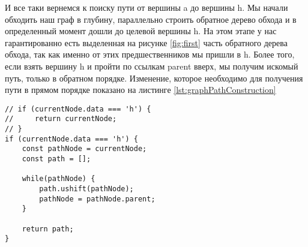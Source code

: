 \documentclass[../article.tex]{subfiles}
\begin{document}
И все таки вернемся к поиску пути от вершины {\firacodebold a} до вершины {\firacodebold h}. Мы начали обходить наш граф в глубину, параллельно строить обратное дерево обхода и в определенный момент дошли до целевой вершины {\firacodebold h}. На этом этапе у нас гарантированно есть выделенная на рисунке \ref{fig:first} часть обратного дерева обхода, так как именно от этих предшественников мы пришли в {\firacodebold h}. Более того, если взять вершину {\firacodebold h} и пройти по ссылкам {\firacodebold parent} вверх, мы получим искомый путь, только в обратном порядке. Изменение, которое необходимо для получения пути в прямом порядке показано на листинге \ref{lst:graphPathConstruction}

\begin{figure*}
    \begin{ruledelement}
        \begin{lstlisting}[caption={Построение пути до найденной вершины}, label={lst:graphPathConstruction}]
// if (currentNode.data === 'h') {
//     return currentNode;
// }
if (currentNode.data === 'h') {
    const pathNode = currentNode;
    const path = [];

    while(pathNode) {
        path.ushift(pathNode);
        pathNode = pathNode.parent;
    }

    return path;
}
        \end{lstlisting}
    \end{ruledelement}

\end{figure*}
\end{document}
